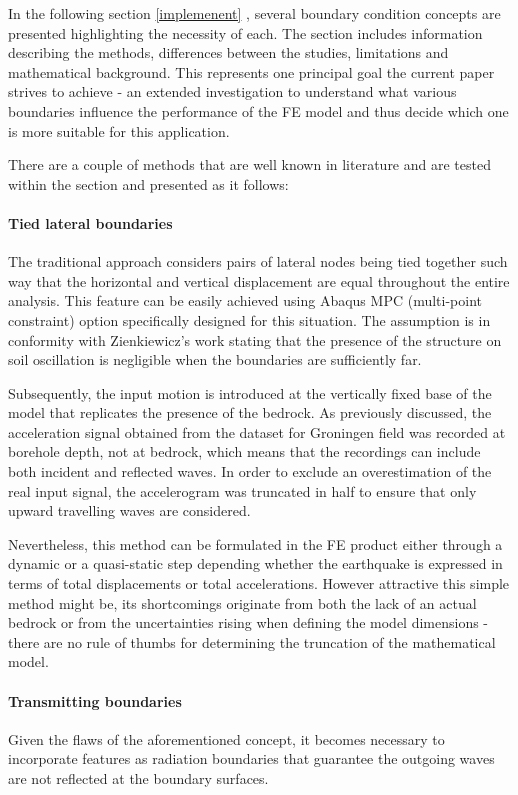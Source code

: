 In the following section \ref{implemenent} , several boundary condition concepts are presented highlighting the necessity of each. The section includes information describing the methods, differences between the studies, limitations and mathematical background. This represents one principal goal the current paper strives to achieve - an extended investigation to understand what various boundaries influence the performance of the FE model and thus decide which one is more suitable for this application.

There are a couple of methods that are well known in literature and are tested within the section and presented as it follows: 
 \paragraph{Tied lateral boundaries}
	The traditional approach considers pairs of lateral nodes being tied together such way that the horizontal and vertical displacement are equal throughout the entire analysis. This feature can be easily achieved using Abaqus MPC (multi-point constraint) option specifically designed for this situation. The assumption is in conformity with Zienkiewicz's work stating that the presence of the structure on soil oscillation is negligible when the boundaries are sufficiently far.
	
	Subsequently, the input motion is introduced at the vertically fixed base of the model that replicates the presence of the bedrock. As previously discussed, the acceleration signal obtained from the dataset for Groningen field was recorded at borehole depth, not at bedrock, which means that the recordings can include both incident and reflected waves. In order to exclude an overestimation of the real input signal, the accelerogram was truncated in half to ensure that only upward travelling waves are considered.
	
	Nevertheless, this method can be formulated in the FE product either through a dynamic or a quasi-static step depending whether the earthquake is expressed in terms of total displacements or total accelerations.
	However attractive this simple method might be, its shortcomings originate from both the lack of an actual bedrock or from the uncertainties rising when defining the model dimensions - there are no rule of thumbs for determining the truncation of the mathematical model.
	
	\paragraph{Transmitting boundaries}
	Given the flaws of the aforementioned concept, it becomes necessary to incorporate features as radiation boundaries that guarantee the outgoing waves are not reflected at the boundary surfaces. 
	

